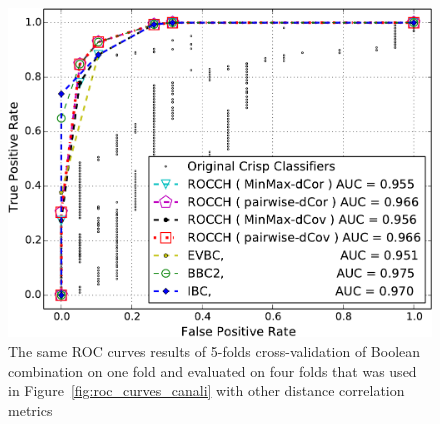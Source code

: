 \begin{figure}[t]
\centering
\includegraphics[width=\columnwidth]{figs/Canali/IBC_BCC_Pruned_Classifier_ConvexHull_withoutRandom_validation_4fold_dCov}
\caption{The same ROC curves results of 5-folds cross-validation of Boolean combination on one fold and evaluated on four folds that was used in Figure~\ref{fig:roc_curves_canali} with other distance correlation metrics}
\label{fig:roc_curves_dcov_canali}
\end{figure}



\begin{table}[b]
    \centering
    \renewcommand{\arraystretch}{1.3}
    \caption{Average AUC values and their standard deviations over the 5FCV for each techniques. Design on four folds and evaluated on one fold on Canali. }
    \label{tab:auc_canali}
    \centering
\end{table}

